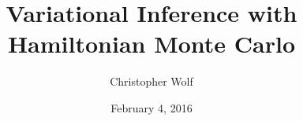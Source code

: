 \documentclass{beamer}
\title[Short title]{Variational Inference with Hamiltonian Monte Carlo} %
\author{Christopher Wolf} %
\institute[] %
{Technische Universit\"at M\"unchen  \\ %
\medskip
\textit{christopher.wolf@tum.de} %
}
\date{February 4, 2016} %
\newcommand*{\mytitle}{Production \& Capacity Planning} %
\newcommand*{\myauthor}{Christopher Wolf} %
\newcommand*{\mydate}{May 27,2015} %
\begin{document}



\begin{frame}
\titlepage %
\end{frame}


\end{document}
